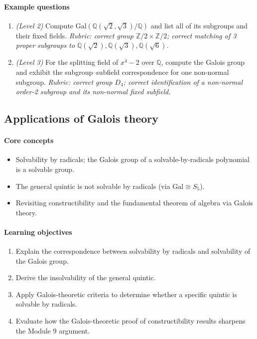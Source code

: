 \documentclass{article}
\begin{document}
\paragraph{Example questions}
\begin{enumerate}[nosep]
  \item \emph{(Level 2)} Compute $\mathrm{Gal}(\mathbb{Q}(\sqrt2,\sqrt3)/\mathbb{Q})$ and list all of its subgroups and their fixed fields. \emph{Rubric: correct group $\mathbb{Z}/2\times\mathbb{Z}/2$; correct matching of 3 proper subgroups to $\mathbb{Q}(\sqrt2),\mathbb{Q}(\sqrt3),\mathbb{Q}(\sqrt6)$.}
  \item \emph{(Level 3)} For the splitting field of $x^4-2$ over $\mathbb{Q}$, compute the Galois group and exhibit the subgroup--subfield correspondence for one non-normal subgroup. \emph{Rubric: correct group $D_4$; correct identification of a non-normal order-2 subgroup and its non-normal fixed subfield.}
\end{enumerate}

\subsection{Applications of Galois theory}
\paragraph{Core concepts}
\begin{itemize}[nosep]
  \item Solvability by radicals; the Galois group of a solvable-by-radicals polynomial is a solvable group.
  \item The general quintic is not solvable by radicals (via $\mathrm{Gal} \cong S_5$).
  \item Revisiting constructibility and the fundamental theorem of algebra via Galois theory.
\end{itemize}
\paragraph{Learning objectives}
\begin{enumerate}[nosep]
  \item Explain the correspondence between solvability by radicals and solvability of the Galois group.
  \item Derive the insolvability of the general quintic.
  \item Apply Galois-theoretic criteria to determine whether a specific quintic is solvable by radicals.
  \item Evaluate how the Galois-theoretic proof of constructibility results sharpens the Module 9 argument.
\end{enumerate}
\end{document}
